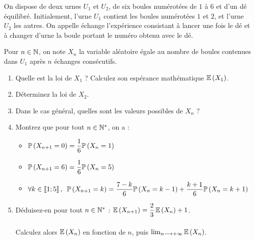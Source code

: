 \begin{exoss}
On dispose de deux urnes \(U_1\) et \(U_2\), de six boules numérotées de \(1\) à \(6\) et d'un dé équilibré. Initialement, l'urne \(U_1\) contient les boules numérotées \(1\) et \(2\), et l'urne \(U_2\) les autres. On appelle échange l'expérience consistant à lancer une fois le dé et à changer d'urne la boule portant le numéro obtenu avec le dé.

Pour \(n\in\mathbb{N}\), on note \(X_n\) la variable aléatoire égale au nombre de boules contenues dans \(U_1\) après \(n\) échanges consécutifs.

\begin{enumerate}
    \item Quelle est la loi de \(X_1\) ? Calculez son espérance mathématique \(\operatorname{\mathbb{E}}\left(X_1\right)\). \\
    \item Déterminez la loi de \(X_2\). \\
    \item Dans le cas général, quelles sont les valeurs possibles de \(X_n\) ? \\
    \item Montrez que pour tout \(n\in\mathbb{N}^*\), on a : \begin{itemize}
        \item \(\mathbb{P}\left(X_{n+1}=0\right)=\dfrac{1}{6}\mathbb{P}\left(X_n=1\right)\)
        \item \(\mathbb{P}\left(X_{n+1}=6\right)=\dfrac{1}{6}\mathbb{P}\left(X_n=5\right)\)
        \item \(\quantifs{\forall k\in\interventierii{1}{5}}\proba{X_{n+1}=k}=\dfrac{7-k}{6}\proba{X_n=k-1}+\dfrac{k+1}{6}\proba{X_n=k+1}\) \\
    \end{itemize}
    \item Déduisez-en pour tout \(n\in\mathbb{N}^*\) : \(\operatorname{\mathbb{E}}\left(X_{n+1}\right)=\dfrac{2}{3}\operatorname{\mathbb{E}}\left(X_n\right)+1\). \\\\ Calculez alors \(\operatorname{\mathbb{E}}\left(X_n\right)\) en fonction de \(n\), puis \(\lim_{n\longrightarrow+\infty}\operatorname{\mathbb{E}}\left(X_n\right)\).
\end{enumerate}
\end{exoss}

